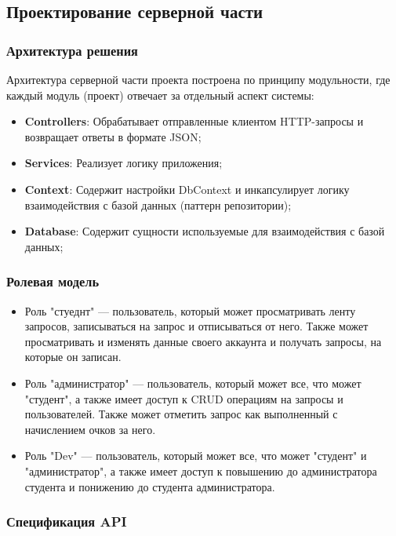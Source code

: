 \subsection{Проектирование серверной части}

\subsubsection{Архитектура решения}

Архитектура серверной части проекта построена по принципу модульности, где каждый модуль (проект) отвечает за отдельный аспект системы:

\begin{itemize}
	\item{\textbf{Controllers}: Обрабатывает отправленные клиентом HTTP-запросы и возвращает ответы в формате JSON;}
	\item{\textbf{Services}: Реализует логику приложения;}
	\item{\textbf{Context}: Содержит настройки DbContext и инкапсулирует логику взаимодействия с базой данных (паттерн репозитории);}	
	\item{\textbf{Database}: Содержит сущности используемые для взаимодействия с базой данных;}
\end{itemize}

\subsubsection{Ролевая модель}
 
\begin{itemize}
	\item{Роль "стуеднт" --- пользователь, который может просматривать ленту запросов, записываться на запрос и отписываться от него. Также может просматривать и изменять данные своего аккаунта и получать запросы, на которые он записан.}
	\item{Роль "администратор" --- пользователь, который может все, что может "студент", а также имеет доступ к CRUD операциям на запросы и пользователей. Также может отметить запрос как выполненный с начислением очков за него.}
	\item{Роль "Dev" --- пользователь, который может все, что может "студент" и "администратор", а также имеет доступ к повышению до администратора студента и понижению до студента администратора.}
\end{itemize}

\subsubsection{Спецификация API}

